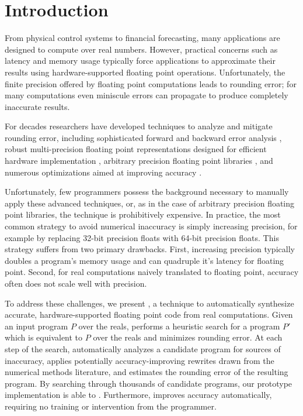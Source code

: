 \documentclass[paper.tex]{subfiles}
\begin{document}
\section{Introduction}
\label{sec:intro}

From physical control systems to financial forecasting, many
applications are designed to compute over real numbers.  However,
practical concerns such as latency and memory usage typically force
applications to approximate their results using hardware-supported
floating point operations.  Unfortunately, the finite precision
offered by floating point computations leads to rounding error; for
many computations even miniscule errors can propagate to produce
completely inaccurate results.


For decades researchers have developed techniques to analyze and
mitigate rounding error, including sophisticated forward and backward
error analysis , robust multi-precision floating point
representations designed for efficient hardware implementation
, arbitrary precision floating point libraries ,
and numerous optimizations aimed at improving accuracy .


Unfortunately, few programmers possess the background necessary to
manually apply these advanced techniques, or, as in the case of
arbitrary precision floating point libraries, the technique is
prohibitively expensive.  In practice, the most common strategy to
avoid numerical inaccuracy is simply increasing precision, for example
by replacing 32-bit precision floats with 64-bit precision floats.
This strategy suffers from two primary drawbacks.  First, increasing
precision typically doubles a program's memory usage and can quadruple
it's latency for floating point.  Second, for real computations
naively translated to floating point, accuracy often does not scale
well with precision.  

To address these challenges, we present \casio, a technique to
automatically synthesize accurate, hardware-supported floating point
code from real computations.  Given an input program $P$ over the
reals, \casio performs a heuristic search for a program $P'$ which is
equivalent to $P$ over the reals and minimizes rounding error.  At
each step of the search, \casio automatically analyzes a candidate
program for sources of inaccuracy, applies potentially
accuracy-improving rewrites drawn from the numerical methods
literature, and estimates the rounding error of the resulting program.
By searching through thousands of candidate programs, our prototype
implementation is able to .
Furthermore, \casio improves accuracy automatically, requiring no
training or intervention from the programmer.
\end{document}
